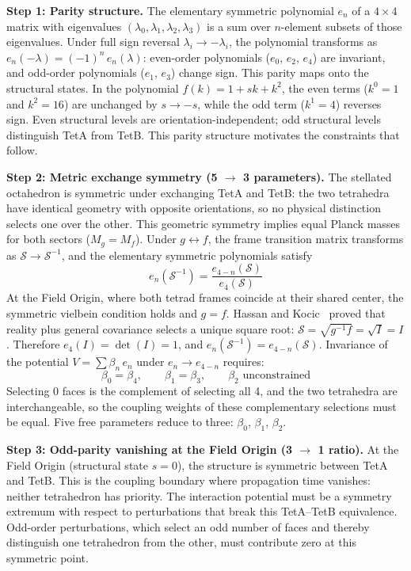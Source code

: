 \documentclass[aps,prd,preprint,superscriptaddress,showpacs,preprintnumbers,amsmath,amssymb,nofootinbib]{revtex4-2}
\begin{document}
\textbf{Step 1: Parity structure.} The elementary symmetric polynomial $e_n$ of a $4 \times 4$ matrix with eigenvalues $(\lambda_0, \lambda_1, \lambda_2, \lambda_3)$ is a sum over $n$-element subsets of those eigenvalues. Under full sign reversal $\lambda_i \to -\lambda_i$, the polynomial transforms as $e_n(-\lambda) = (-1)^n\,e_n(\lambda)$: even-order polynomials ($e_0$, $e_2$, $e_4$) are invariant, and odd-order polynomials ($e_1$, $e_3$) change sign. This parity maps onto the structural states. In the polynomial $f(k) = 1 + sk + k^2$, the even terms ($k^0 = 1$ and $k^2 = 16$) are unchanged by $s \to -s$, while the odd term ($k^1 = 4$) reverses sign. Even structural levels are orientation-independent; odd structural levels distinguish TetA from TetB. This parity structure motivates the constraints that follow.

\textbf{Step 2: Metric exchange symmetry (5 $\to$ 3 parameters).} The stellated octahedron is symmetric under exchanging TetA and TetB: the two tetrahedra have identical geometry with opposite orientations, so no physical distinction selects one over the other. This geometric symmetry implies equal Planck masses for both sectors ($M_g = M_f$). Under $g \leftrightarrow f$, the frame transition matrix transforms as $\mathcal{S} \to \mathcal{S}^{-1}$, and the elementary symmetric polynomials satisfy
\begin{equation}
e_n(\mathcal{S}^{-1}) = \frac{e_{4-n}(\mathcal{S})}{e_4(\mathcal{S})}
\end{equation}
At the Field Origin, where both tetrad frames coincide at their shared center, the symmetric vielbein condition holds and $g = f$. Hassan and Kocic~\cite{hassankocic2018} proved that reality plus general covariance selects a unique square root: $\mathcal{S} = \sqrt{g^{-1}f} = \sqrt{I} = I$. Therefore $e_4(I) = \det(I) = 1$, and $e_n(\mathcal{S}^{-1}) = e_{4-n}(\mathcal{S})$. Invariance of the potential $V = \sum \beta_n\,e_n$ under $e_n \to e_{4-n}$ requires:
\begin{equation}
\beta_0 = \beta_4, \qquad \beta_1 = \beta_3, \qquad \beta_2 \text{ unconstrained}
\end{equation}
Selecting 0 faces is the complement of selecting all 4, and the two tetrahedra are interchangeable, so the coupling weights of these complementary selections must be equal. Five free parameters reduce to three: $\beta_0$, $\beta_1$, $\beta_2$.

\textbf{Step 3: Odd-parity vanishing at the Field Origin (3 $\to$ 1 ratio).} At the Field Origin (structural state $s = 0$), the structure is symmetric between TetA and TetB. This is the coupling boundary where propagation time vanishes: neither tetrahedron has priority. The interaction potential must be a symmetry extremum with respect to perturbations that break this TetA--TetB equivalence. Odd-order perturbations, which select an odd number of faces and thereby distinguish one tetrahedron from the other, must contribute zero at this symmetric point.
\end{document}
